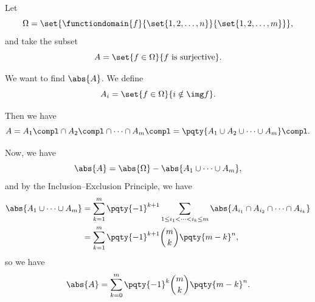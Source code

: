\begin{example}
    \label{ex:counting-surjections}%
    Let
    \[
        \Omega = \set{\functiondomain{f}{\set{1, 2, \ldots, n}}{\set{1, 2, \ldots, m}}},
    \]
    and take the subset
    \[
        A = \set{f \in \Omega}{f \text{ is surjective}}.
    \]

    We want to find \(\abs{A}\). We define
    \[
        A_i = \set{f \in \Omega}{i \notin \img f}.
    \]

    Then we have
    \[
        A = A_1\compl \cap A_2\compl \cap \cdots \cap A_m\compl = \pqty{A_1 \cup A_2 \cup \cdots \cup A_m}\compl.
    \]

    Now, we have
    \[
        \abs{A} = \abs{\Omega} - \abs{A_1 \cup \cdots \cup A_m},
    \]
    and by the Inclusion--Exclusion Principle, we have
    \begin{align*}
        \abs{A_1 \cup \cdots \cup A_m} &= \sum_{k = 1}^{m} \pqty{-1}^{k + 1} \sum_{1 \leq i_1 < \cdots < i_k \leq m} \abs{A_{i_1} \cap A_{i_2} \cap \cdots \cap A_{i_k}} \\
        &= \sum_{k = 1}^{m} \pqty{-1}^{k + 1} \binom{m}{k} \pqty{m - k}^n,
    \end{align*}
    so we have
    \[
        \abs{A} = \sum_{k = 0}^{m} \pqty{-1}^{k} \binom{m}{k} \pqty{m - k}^{n}.
    \]
\end{example}


